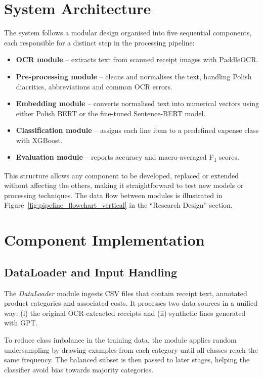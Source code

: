\documentclass{SGGW-thesis-EN}
\begin{document}
\section{System Architecture}
The system follows a modular design organised into five sequential components, each responsible for a distinct step in
the processing pipeline:

\begin{itemize}
  \item \textbf{OCR module} – extracts text from scanned receipt images with PaddleOCR.
  \item \textbf{Pre-processing module} – cleans and normalises the text, handling Polish diacritics, abbreviations and
        common OCR errors.
  \item \textbf{Embedding module} – converts normalised text into numerical vectors using either Polish BERT or the
        fine-tuned Sentence-BERT model.
  \item \textbf{Classification module} – assigns each line item to a predefined expense class with XGBoost.
  \item \textbf{Evaluation module} – reports accuracy and macro-averaged F\textsubscript{1} scores.
\end{itemize}

This structure allows any component to be developed, replaced or extended without affecting the others, making it
straightforward to test new models or processing techniques. The data flow between modules is illustrated in
Figure~\ref{fig:pipeline_flowchart_vertical} in the “Research Design” section.

\section{Component Implementation}

\subsection{DataLoader and Input Handling}
The \textit{DataLoader} module ingests CSV files that contain receipt text, annotated product categories and
associated costs. It processes two data sources in a unified way: (i) the original OCR-extracted receipts and (ii)
synthetic lines generated with GPT.

To reduce class imbalance in the training data, the module applies random undersampling by drawing examples from each
category until all classes reach the same frequency. The balanced subset is then passed to later stages, helping the
classifier avoid bias towards majority categories.
\end{document}
